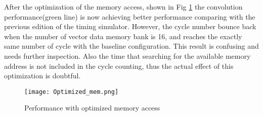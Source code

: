 \documentclass[conference]{IEEEtran}
\begin{document}
After the optimization of the memory access, shown in Fig \ref{fig:opt_mem} the convolution performance(green line) is now achieving better performance comparing with the previous edition of the timing simulator. However, the cycle number bounce back when the number of vector data memory bank is 16, and reaches the exactly same number of cycle with the baseline configuration. This result is confusing and needs further inspection. Also the time that searching for the available memory address is not included in the cycle counting, thus the actual effect of this optimization is doubtful.

\begin{figure}[h]
    \centering
    \texttt{[image: Optimized\_mem.png]}
    \caption{Performance with optimized memory access}
    \label{fig:opt_mem}
\end{figure}

\nocite{*}


\end{document}
